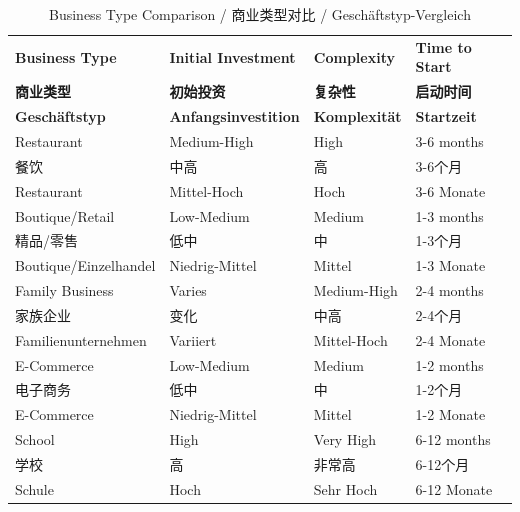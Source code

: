 \begin{table}[ht]
\centering
\begin{tabular}{|p{2cm}|p{3cm}|p{3cm}|p{3cm}|}
\hline
\textbf{Business Type} & \textbf{Initial Investment} & \textbf{Complexity} & \textbf{Time to Start} \\
\textbf{商业类型} & \textbf{初始投资} & \textbf{复杂性} & \textbf{启动时间} \\
\textbf{Geschäftstyp} & \textbf{Anfangsinvestition} & \textbf{Komplexität} & \textbf{Startzeit} \\
\hline
Restaurant & Medium-High & High & 3-6 months \\
餐饮 & 中高 & 高 & 3-6个月 \\
Restaurant & Mittel-Hoch & Hoch & 3-6 Monate \\
\hline
Boutique/Retail & Low-Medium & Medium & 1-3 months \\
精品/零售 & 低中 & 中 & 1-3个月 \\
Boutique/Einzelhandel & Niedrig-Mittel & Mittel & 1-3 Monate \\
\hline
Family Business & Varies & Medium-High & 2-4 months \\
家族企业 & 变化 & 中高 & 2-4个月 \\
Familienunternehmen & Variiert & Mittel-Hoch & 2-4 Monate \\
\hline
E-Commerce & Low-Medium & Medium & 1-2 months \\
电子商务 & 低中 & 中 & 1-2个月 \\
E-Commerce & Niedrig-Mittel & Mittel & 1-2 Monate \\
\hline
School & High & Very High & 6-12 months \\
学校 & 高 & 非常高 & 6-12个月 \\
Schule & Hoch & Sehr Hoch & 6-12 Monate \\
\hline
\end{tabular}
\caption{Business Type Comparison / 商业类型对比 / Geschäftstyp-Vergleich}
\end{table}

